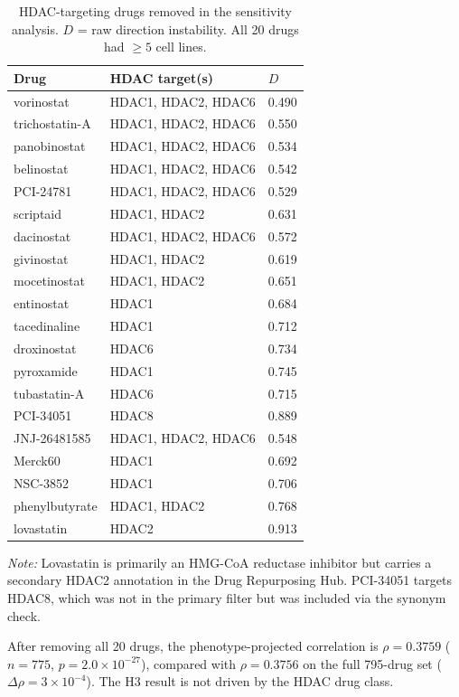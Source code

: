 \documentclass[11pt]{article}
\begin{document}
\begin{table}[htbp]
\centering
\caption{HDAC-targeting drugs removed in the sensitivity analysis.
$D$ = raw direction instability.  All 20 drugs had $\geq 5$ cell lines.}
\label{tab:hdac_drugs}
\begin{tabular}{@{}lll@{}}
\toprule
Drug & HDAC target(s) & $D$ \\
\midrule
vorinostat      & HDAC1, HDAC2, HDAC6 & 0.490 \\
trichostatin-A  & HDAC1, HDAC2, HDAC6 & 0.550 \\
panobinostat    & HDAC1, HDAC2, HDAC6 & 0.534 \\
belinostat      & HDAC1, HDAC2, HDAC6 & 0.542 \\
PCI-24781       & HDAC1, HDAC2, HDAC6 & 0.529 \\
scriptaid       & HDAC1, HDAC2        & 0.631 \\
dacinostat      & HDAC1, HDAC2, HDAC6 & 0.572 \\
givinostat      & HDAC1, HDAC2        & 0.619 \\
mocetinostat    & HDAC1, HDAC2        & 0.651 \\
entinostat      & HDAC1               & 0.684 \\
tacedinaline    & HDAC1               & 0.712 \\
droxinostat     & HDAC6               & 0.734 \\
pyroxamide      & HDAC1               & 0.745 \\
tubastatin-A    & HDAC6               & 0.715 \\
PCI-34051       & HDAC8               & 0.889 \\
JNJ-26481585    & HDAC1, HDAC2, HDAC6 & 0.548 \\
Merck60         & HDAC1               & 0.692 \\
NSC-3852        & HDAC1               & 0.706 \\
phenylbutyrate  & HDAC1, HDAC2        & 0.768 \\
lovastatin      & HDAC2               & 0.913 \\
\bottomrule
\end{tabular}

\smallskip
\noindent\textit{Note:} Lovastatin is primarily an HMG-CoA reductase
inhibitor but carries a secondary HDAC2 annotation in the Drug
Repurposing Hub.  PCI-34051 targets HDAC8, which was not in the primary
filter but was included via the synonym check.
\end{table}

After removing all 20 drugs, the phenotype-projected correlation is
$\rho = 0.3759$ ($n = 775$, $p = 2.0 \times 10^{-27}$), compared with
$\rho = 0.3756$ on the full 795-drug set
($\Delta\rho = 3 \times 10^{-4}$).  The H3 result is not driven by the
HDAC drug class.
\end{document}
